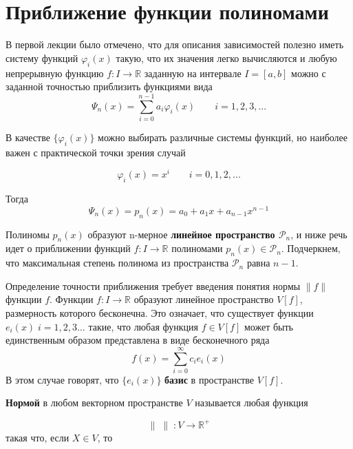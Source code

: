 \section{Приближение функции полиномами}

\label{lecture:2}

В первой лекции было отмечено, что для описания зависимостей полезно иметь систему функций $\varphi _i(x)$ такую, что их значения легко вычисляются и любую непрерывную функцию $f: I \rightarrow \mathbb{R} $ заданную на интервале $ I = [a,b] $ можно с заданной точностью приблизить функциями вида 
\begin{equation}
\varPsi_n(x)=\sum_{i=0}^{n-1}{a_i\varphi_i(x)} \qquad i = 1, 2, 3, ...
\end{equation}

В качестве $\{\varphi_i(x)\}$ можно выбирать различные системы функций, но наиболее важен с практической точки зрения случай 


\begin{equation}
\varphi _i(x) = x^i \qquad i = 0, 1, 2, ...
\end{equation}

Тогда
\begin{equation}\label{eq:polynom}
\varPsi _n(x) = p_n(x) = a_0 + a_1x + a_{n-1}x^{n-1} 
\end{equation}


Полиномы $p_n(x)$ образуют n-мерное \textbf{линейное пространство $\mathscr{P}_n$}, и ниже речь идет о приближении функций  $f:I \rightarrow \mathbb{R} $ полиномами $p_n(x) \in \mathscr{P}_n $. Подчеркнем, что максимальная степень полинома из пространства  $\mathscr{P}_n$ равна $n - 1$.


Определение точности приближения требует введения понятия нормы $\parallel f \parallel$ функции $f$. 
Функции $f: I \rightarrow \mathbb{R} $ образуют линейное пространство $V[f]$, размерность которого бесконечна. Это означает, что существует функции $e_i(x) \; i = 1, 2, 3 ...$ такие, что любая функция $f \in V[f]$ может быть единственным образом представлена в виде бесконечного ряда 
\begin{equation}
f(x) = \sum_{i=0}^{\infty} {c_i e_i(x)}
\end{equation}
В этом случае говорят, что $\{e_i(x)\}$ \textbf{базис} в пространстве $V[f]$.

\textbf{Нормой} в любом векторном пространстве $V$ называется любая функция 
 
\begin{equation}
\parallel \; \parallel \; : V \rightarrow \mathbb{R}^+
\end{equation}
такая что, если $X\in V$, то

